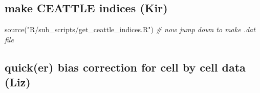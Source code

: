 \documentclass[
]{article}
\newenvironment{Shaded}{\begin{snugshade}}{\end{snugshade}}
\newcommand{\CommentTok}[1]{\textcolor[rgb]{0.56,0.35,0.01}{\textit{#1}}}
\newcommand{\FunctionTok}[1]{\textcolor[rgb]{0.00,0.00,0.00}{#1}}
\newcommand{\NormalTok}[1]{#1}
\newcommand{\StringTok}[1]{\textcolor[rgb]{0.31,0.60,0.02}{#1}}
\begin{document}
\hypertarget{make-ceattle-indices-kir}{%
\subsection{make CEATTLE indices (Kir)}\label{make-ceattle-indices-kir}}

\begin{Shaded}
\begin{Highlighting}[]
\FunctionTok{source}\NormalTok{(}\StringTok{"R/sub\_scripts/get\_ceattle\_indices.R"}\NormalTok{)}
\CommentTok{\# now jump down to make .dat file}
\end{Highlighting}
\end{Shaded}

\hypertarget{quicker-bias-correction-for-cell-by-cell-data-liz}{%
\subsection{quick(er) bias correction for cell by cell data
(Liz)}\label{quicker-bias-correction-for-cell-by-cell-data-liz}}
\end{document}
